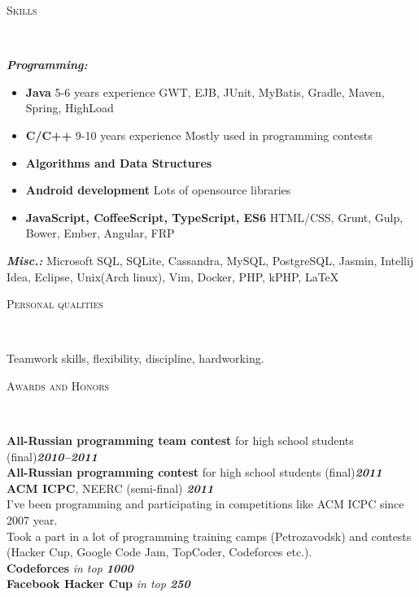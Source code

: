 \documentclass[12pt]{article}
\newenvironment{changemargin}[2]{%
  \begin{list}{}{%
    \setlength{\topsep}{0pt}%
    \setlength{\leftmargin}{#1}%
    \setlength{\rightmargin}{#2}%
    \setlength{\listparindent}{\parindent}%
    \setlength{\itemindent}{\parindent}%
    \setlength{\parsep}{\parskip}%
  }%
  \item[]}{\end{list}
}
\newcommand{\lineover}{
	\begin{changemargin}{-0.05in}{-0.05in}
		\vspace*{-8pt}
		\hrulefill \\
		\vspace*{-2pt}
	\end{changemargin}
}
\newcommand{\header}[1]{
	\begin{changemargin}{-0.5in}{-0.5in}
		\scshape{#1}\\
  	\lineover
	\end{changemargin}
}
\newenvironment{body} {
	\vspace*{-16pt}
	\begin{changemargin}{-0.25in}{-0.5in}
  }	
	{\end{changemargin}
}
\begin{document}
\smallskip
\newpage
\header{Skills}

\begin{body}
	\vspace{14pt}
	\emph{\textbf{Programming:}}{}
	\begin{itemize}
		\item \textbf{Java} 5-6 years experience
        \subitem GWT, EJB, JUnit, MyBatis, Gradle, Maven, Spring, HighLoad 
		\item \textbf{C/C++} 9-10 years experience
        \subitem Mostly used in programming contests
		\item \textbf{Algorithms and Data Structures}
		\item \textbf{Android development} 
        \subitem Lots of opensource libraries
        \item \textbf{JavaScript, CoffeeScript, TypeScript, ES6}
        \subitem HTML/CSS, Grunt, Gulp, Bower, Ember, Angular, FRP
	\end{itemize}
	\emph{\textbf{Misc.:}}{} Microsoft SQL, SQLite, Cassandra,
    MySQL, PostgreSQL, Jasmin, Intellij Idea, Eclipse, 
	Unix(Arch linux), Vim, Docker, PHP, kPHP, LaTeX
\end{body}

\vspace{14pt}
\smallskip
\header{Personal qualities}

\begin{body}
	\vspace{14pt}
	Teamwork skills, flexibility, discipline, hardworking.
\end{body}

\smallskip

\header{Awards and Honors}

\begin{body}
	\vspace{14pt}
	\textbf{All-Russian programming team contest} for high school students (final)\hfill \emph{\textbf{2010--2011}}\\
	\smallskip
	\textbf{All-Russian programming contest} for high school students (final)\hfill \emph{\textbf{2011}}\\
	\smallskip
	\textbf{ACM ICPC}, NEERC (semi-final) \hfill{} \emph{\textbf{2011}}\\
	\smallskip
	\vspace{14pt}
	I've been programming and participating in competitions like ACM ICPC since 2007 year. \\
	Took a part in a lot of programming training camps (Petrozavodsk) and contests (Hacker Cup, Google Code Jam, TopCoder, Codeforces etc.).\\
	\smallskip
	\textbf{Codeforces} \hfill{} \emph{in top \textbf{1000}}\\
	\smallskip
	\textbf{Facebook Hacker Cup} \hfill{} \emph{in top \textbf{250}}\\
	\smallskip
\end{body}
\end{document}
